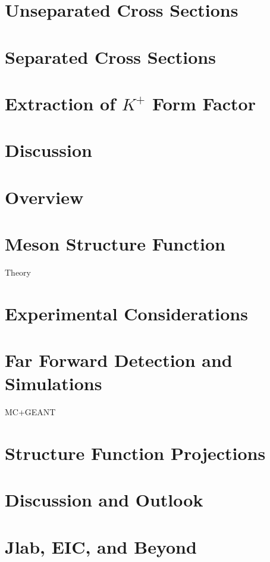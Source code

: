 \documentclass[
]{report}
\begin{document}
\hypertarget{Section-8.3}{%
\section{Unseparated Cross Sections}\label{Section-8.3}}

\hypertarget{Section-8.4}{%
\section{Separated Cross Sections}\label{Section-8.4}}

\hypertarget{Section-8.5}{%
\section{\texorpdfstring{Extraction of \(K^{+}\) Form
Factor}{Extraction of K\^{}\{+\} Form Factor}}\label{Section-8.5}}

\hypertarget{Section-8.6}{%
\section{Discussion}\label{Section-8.6}}

\label{Chapter-9}

\hypertarget{Section-9.1}{%
\section{Overview}\label{Section-9.1}}

\hypertarget{Section-9.2}{%
\section{Meson Structure Function}\label{Section-9.2}}

Theory

\hypertarget{Section-9.3}{%
\section{Experimental Considerations}\label{Section-9.3}}

\hypertarget{Section-9.4}{%
\section{Far Forward Detection and Simulations}\label{Section-9.4}}

MC+GEANT

\hypertarget{Section-9.5}{%
\section{Structure Function Projections}\label{Section-9.5}}

\hypertarget{Section-9.6}{%
\section{Discussion and Outlook}\label{Section-9.6}}

\label{Chapter-10}

\hypertarget{Section-10.1}{%
\section{Jlab, EIC, and Beyond}\label{Section-10.1}}
\end{document}
